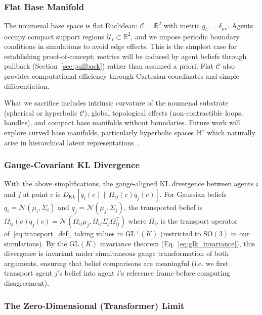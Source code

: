 \documentclass[11pt]{article}
\begin{document}
\subsubsection{Flat Base Manifold}

The noumenal base space is flat Euclidean: $\mathcal{C} = \mathbb{R}^2$ with metric $g_{\mathcal{C}} = \delta_{\mu\nu}$. Agents occupy compact support regions $\mathcal{U}_i \subset \mathbb{R}^2$, and we impose periodic boundary conditions in simulations to avoid edge effects. This is the simplest case for establishing proof-of-concept; metrics will be induced by agent beliefs through pullback (Section~\ref{sec:pullback}) rather than assumed a priori. Flat $\mathcal{C}$ also provides computational efficiency through Cartesian coordinates and simple differentiation.

What we sacrifice includes intrinsic curvature of the noumenal substrate (spherical or hyperbolic $\mathcal{C}$), global topological effects (non-contractible loops, handles), and compact base manifolds without boundaries. Future work will explore curved base manifolds, particularly hyperbolic spaces $\mathbb{H}^n$ which naturally arise in hierarchical latent representations~\cite{Nickel2017}.

\subsubsection{Gauge-Covariant KL Divergence}

With the above simplifications, the gauge-aligned KL divergence between agents $i$ and $j$ at point $c$ is $D_{\mathrm{KL}}[q_i(c) \| \Omega_{ij}(c)q_j(c)]$. For Gaussian beliefs $q_i = \mathcal{N}(\mu_i, \Sigma_i)$ and $q_j = \mathcal{N}(\mu_j, \Sigma_j)$, the transported belief is $\Omega_{ij}(c)q_j(c) = \mathcal{N}(\Omega_{ij}\mu_j, \Omega_{ij}\Sigma_j\Omega_{ij}^\top)$ where $\Omega_{ij}$ is the transport operator of~\eqref{eq:transport_def}, taking values in $\mathrm{GL}^+(K)$ (restricted to $\mathrm{SO}(3)$ in our simulations). By the $\mathrm{GL}(K)$ invariance theorem (Eq.~\ref{eq:glk_invariance}), this divergence is invariant under simultaneous gauge transformation of both arguments, ensuring that belief comparisons are meaningful  (i.e. we first transport agent $j$'s belief into agent $i$'s reference frame before computing disagreement).

\subsubsection{The Zero-Dimensional (Transformer) Limit}
\end{document}
